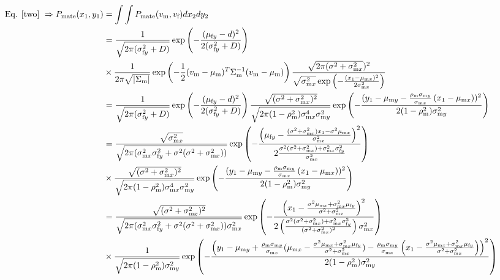 \documentclass{article}
\newcommand{\x}[1]{\text{#1}}
\begin{document}
\begin{align*}
\text{Eq. \ref{two} }\Rightarrow P_\text{mate}(x_1,y_1)&=\int\int P_\text{mate}(v_\x{m},v_\x{f})dx_2dy_2
\\&=\frac{1}{\sqrt{2\pi(\sigma_{\x{f}y}^2+D)}}\exp\left(-\frac{(\mu_{\x{f}y}-d)^2}{2(\sigma_{\x{f}y}^2+D)}\right) 
\\&\times \frac{1}{2\pi\sqrt{|\Sigma_\x{m}|}}\exp\left(-\frac{1}{2}(v_\x{m}-\mu_\x{m})^T\Sigma_\x{m}^{-1}(v_\x{m}-\mu_\x{m})\right)\frac{\sqrt{2\pi(\sigma^2+\sigma_{\x{m}x}^2})^2}{\sqrt{\sigma_{\x{m}x}^2}\exp\left(-\frac{(x_1-\mu_{\x{m}x})^2}{2\sigma_{\x{m}x}^2}\right)}
\\&=\frac{1}{\sqrt{2\pi(\sigma_{\x{f}y}^2+D)}}\exp\left(-\frac{(\mu_{\x{f}y}-d)^2}{2(\sigma_{\x{f}y}^2+D)}\right)\frac{\sqrt{(\sigma^2+\sigma_{\x{m}x}^2)^2}}{\sqrt{2\pi (1-\rho_\x{m}^2)\sigma_{\x{m}x}^4\sigma_{\x{m}y}^2}}\exp\left(-\frac{(y_1-\mu_{\x{m}y}-\frac{\rho_\x{m}\sigma_{\x{m}y}}{\sigma_{\x{m}x}}\left(x_1-\mu_{\x{m}x}\right))^2}{2(1-\rho_\x{m}^2)\sigma_{\x{m}y}^2}\right)
\\&=\frac{\sqrt{\sigma_{\x{m}x}^2}}{\sqrt{2\pi(\sigma_{\x{m}x}^2\sigma_{\x{f}y}^2+\sigma^2(\sigma^2+\sigma_{\x{m}x}^2))}}\exp\left(-\frac{\left(\mu_{\x{f}y}-\frac{(\sigma^2+\sigma_{\x{m}x}^2)x_1-\sigma^2\mu_{\x{m}x}}{\sigma_{\x{m}x}^2}\right)^2}{2\frac{\sigma^2(\sigma^2+\sigma_{\x{m}x}^2)+\sigma_{\x{m}x}^2\sigma_{\x{f}y}^2}{\sigma_{\x{m}x}^2}}\right)
\\&\times\frac{\sqrt{(\sigma^2+\sigma_{\x{m}x}^2)^2}}{\sqrt{2\pi (1-\rho_\x{m}^2)\sigma_{\x{m}x}^4\sigma_{\x{m}y}^2}}\exp\left(-\frac{(y_1-\mu_{\x{m}y}-\frac{\rho_\x{m}\sigma_{\x{m}y}}{\sigma_{\x{m}x}}\left(x_1-\mu_{\x{m}x}\right))^2}{2(1-\rho_\x{m}^2)\sigma_{\x{m}y}^2}\right)
\\&=\frac{\sqrt{(\sigma^2+\sigma_{\x{m}x}^2)^2}}{\sqrt{2\pi(\sigma_{\x{m}x}^2\sigma_{\x{f}y}^2+\sigma^2(\sigma^2+\sigma_{\x{m}x}^2))\sigma_{\x{m}x}^2}}\exp\left(-\frac{\left(x_1-\frac{\sigma^2\mu_{\x{m}x}+\sigma_{\x{m}x}^2\mu_{\x{f}y}}{\sigma^2+\sigma_{\x{m}x}^2}\right)^2}{2\left(\frac{\sigma^2(\sigma^2+\sigma_{\x{m}x}^2)+\sigma_{\x{m}x}^2\sigma_{\x{f}y}^2}{(\sigma^2+\sigma_{\x{m}x}^2)^2}\right)\sigma_{\x{m}x}^2}\right)
\\&\times\frac{1}{\sqrt{2\pi (1-\rho_\x{m}^2)\sigma_{\x{m}y}^2}}\exp\left(-\frac{\left(y_1-\mu_{\x{m}y}+\frac{\rho_\x{m}\sigma_{\x{m}y}}{\sigma_{\x{m}x}}(\mu_{\x{m}x}-\frac{\sigma^2\mu_{\x{m}x}+\sigma_{\x{m}x}^2\mu_{\x{f}y}}{\sigma^2+\sigma_{\x{m}x}^2})-\frac{\rho_\x{m}\sigma_{\x{m}y}}{\sigma_{\x{m}x}}\left(x_1-\frac{\sigma^2\mu_{\x{m}x}+\sigma_{\x{m}x}^2\mu_{\x{f}y}}{\sigma^2+\sigma_{\x{m}x}^2}\right)\right)^2}{2(1-\rho_\x{m}^2)\sigma_{\x{m}y}^2}\right)

\end{align*}
\end{document}
